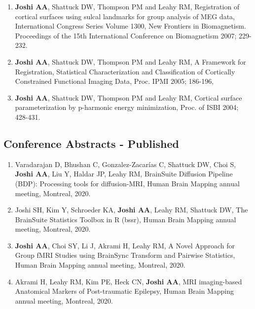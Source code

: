 \documentclass[overlapped,line,letterpaper]{res}
\begin{document}
\begin{resume}
\begin{enumerate}
    \item \textbf{Joshi AA}, Shattuck DW, Thompson PM and Leahy RM, {Registration of cortical surfaces using sulcal landmarks for group analysis of MEG data}, International Congress Series Volume 1300, New Frontiers in Biomagnetism. Proceedings of the 15th International Conference on Biomagnetism 2007; 229-232.

    \item \textbf{Joshi AA}, Shattuck DW, Thompson PM and Leahy RM, {A Framework for Registration, Statistical Characterization and Classification of Cortically Constrained Functional Imaging Data}, Proc. IPMI 2005;  186-196,

    \item \textbf{Joshi AA}, Shattuck DW, Thompson PM and Leahy RM, {Cortical surface parameterization by p-harmonic energy minimization}, Proc. of ISBI 2004; 428-431.
\end{enumerate}


\subsection{Conference Abstracts - Published}
\begin{enumerate}
   \item Varadarajan D, Bhushan C, Gonzalez-Zacarías C, Shattuck DW, Choi S, \textbf{Joshi AA}, Liu Y, Haldar JP, Leahy RM, {BrainSuite Diffusion Pipeline (BDP): Processing tools for diffusion-MRI}, Human Brain Mapping annual meeting, Montreal, 2020.
    
    \item Joshi SH, Kim Y, Schroeder KA, \textbf{Joshi AA}, Leahy RM, Shattuck DW, {The BrainSuite Statistics Toolbox in R (bssr)}, Human Brain Mapping annual meeting, Montreal, 2020.

    \item \textbf{Joshi AA}, Choi SY, Li J, Akrami H, Leahy RM, {A Novel Approach for Group fMRI Studies using BrainSync Transform and Pairwise Statistics}, Human Brain Mapping annual meeting, Montreal, 2020.
    
    \item Akrami H, Leahy RM, Kim PE, Heck CN, \textbf{Joshi AA}, {MRI imaging-based Anatomical Markers of Post-traumatic Epilepsy}, Human Brain Mapping annual meeting, Montreal, 2020.


\end{enumerate}
\end{resume}
\end{document}

